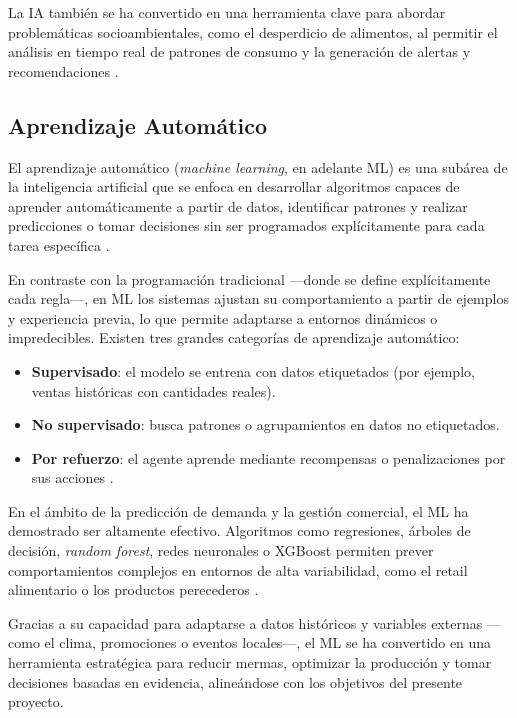 La IA también se ha convertido en una herramienta clave para abordar problemáticas socioambientales, como el desperdicio de alimentos, al permitir el análisis en tiempo real de patrones de consumo y la generación de alertas y recomendaciones \parencite{rolnick2019}.

\subsection{Aprendizaje Automático}

El aprendizaje automático (\textit{machine learning}, en adelante ML) es una subárea de la inteligencia artificial que se enfoca en desarrollar algoritmos capaces de aprender automáticamente a partir de datos, identificar patrones y realizar predicciones o tomar decisiones sin ser programados explícitamente para cada tarea específica \parencite{mitchell1997}.

En contraste con la programación tradicional —donde se define explícitamente cada regla—, en ML los sistemas ajustan su comportamiento a partir de ejemplos y experiencia previa, lo que permite adaptarse a entornos dinámicos o impredecibles. Existen tres grandes categorías de aprendizaje automático:

\begin{itemize}
    \item \textbf{Supervisado}: el modelo se entrena con datos etiquetados (por ejemplo, ventas históricas con cantidades reales).
    
    \item \textbf{No supervisado}: busca patrones o agrupamientos en datos no etiquetados.
    
    \item \textbf{Por refuerzo}: el agente aprende mediante recompensas o penalizaciones por sus acciones \parencite{sutton2018}.
\end{itemize}

En el ámbito de la predicción de demanda y la gestión comercial, el ML ha demostrado ser altamente efectivo. Algoritmos como regresiones, árboles de decisión, \textit{random forest}, redes neuronales o XGBoost permiten prever comportamientos complejos en entornos de alta variabilidad, como el retail alimentario o los productos perecederos \parencite{carbonneau2008}.

Gracias a su capacidad para adaptarse a datos históricos y variables externas —como el clima, promociones o eventos locales—, el ML se ha convertido en una herramienta estratégica para reducir mermas, optimizar la producción y tomar decisiones basadas en evidencia, alineándose con los objetivos del presente proyecto.

